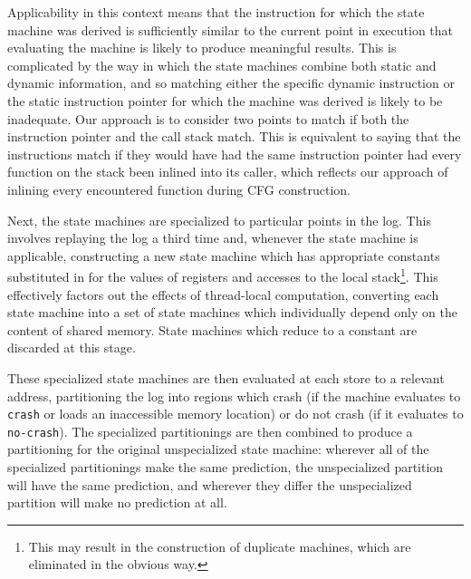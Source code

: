\documentclass[10pt,twocolumn,preprint,natbib,authoryear]{sigplanconf}
\newcommand{\editorial}[1]{}
\begin{document}
Applicability in this context means that the instruction for which the
state machine was derived is sufficiently similar to the current point
in execution that evaluating the machine is likely to produce
meaningful results.  This is complicated by the way in which the state
machines combine both static and dynamic information, and so matching
either the specific dynamic instruction or the static instruction
pointer for which the machine was derived is likely to be inadequate.
Our approach is to consider two points to match if both the
instruction pointer and the call stack match.  This is equivalent to
saying that the instructions match if they would have had the same
instruction pointer had every function on the stack been inlined into
its caller, which reflects our approach of inlining every encountered
function during CFG construction.

Next, the state machines are specialized to particular points in the
log.  This involves replaying the log a third time and, whenever the
state machine is applicable, constructing a new state machine which
has appropriate constants substituted in for the values of registers
and accesses to the local stack\footnote{This may result in the
  construction of duplicate machines, which are eliminated in the
  obvious way.}.  This effectively factors out the effects of
thread-local computation, converting each state machine into a set of
state machines which individually depend only on the content of shared
memory.  State machines which reduce to a constant are discarded at
this stage.

These specialized state machines are then evaluated at each store to a
relevant address, partitioning the log into regions which crash (if
the machine evaluates to \verb|crash| or loads an inaccessible memory
location) or do not crash (if it evaluates to \verb|no-crash|).  The
specialized partitionings are then combined to produce a partitioning
for the original unspecialized state machine: wherever all of the
specialized partitionings make the same prediction, the unspecialized
partition will have the same prediction, and wherever they differ the
unspecialized partition will make no prediction at all.

\end{document}
